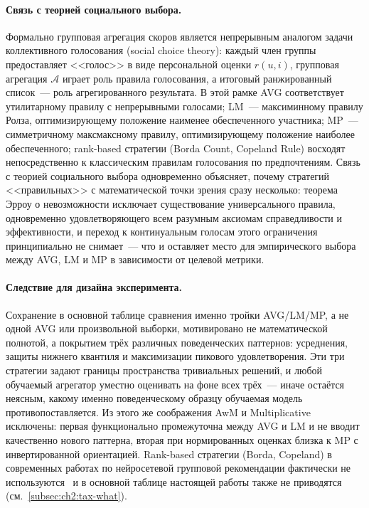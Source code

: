 \paragraph{Связь с теорией социального выбора.} Формально групповая агрегация скоров является непрерывным аналогом задачи коллективного голосования (social choice theory): каждый член группы предоставляет <<голос>> в виде персональной оценки $r(u, i)$, групповая агрегация $\mathcal{A}$ играет роль правила голосования, а итоговый ранжированный список~--- роль агрегированного результата. В этой рамке AVG соответствует утилитарному правилу с непрерывными голосами; LM~--- максиминному правилу Ролза, оптимизирующему положение наименее обеспеченного участника; MP~--- симметричному максмаксному правилу, оптимизирующему положение наиболее обеспеченного; rank-based стратегии (Borda Count, Copeland Rule) восходят непосредственно к классическим правилам голосования по предпочтениям. Связь с теорией социального выбора одновременно объясняет, почему стратегий <<правильных>> с математической точки зрения сразу несколько: теорема Эрроу о невозможности исключает существование универсального правила, одновременно удовлетворяющего всем разумным аксиомам справедливости и эффективности, и переход к континуальным голосам этого ограничения принципиально не снимает~--- что и оставляет место для эмпирического выбора между AVG, LM и MP в зависимости от целевой метрики.

\paragraph{Следствие для дизайна эксперимента.} Сохранение в основной таблице сравнения именно тройки AVG/LM/MP, а не одной AVG или произвольной выборки, мотивировано не математической полнотой, а покрытием трёх различных поведенческих паттернов: усреднения, защиты нижнего квантиля и максимизации пикового удовлетворения. Эти три стратегии задают границы пространства тривиальных решений, и любой обучаемый агрегатор уместно оценивать на фоне всех трёх~--- иначе остаётся неясным, какому именно поведенческому образцу обучаемая модель противопоставляется. Из этого же соображения AwM и Multiplicative исключены: первая функционально промежуточна между AVG и LM и не вводит качественно нового паттерна, вторая при нормированных оценках близка к MP с инвертированной ориентацией. Rank-based стратегии (Borda, Copeland) в современных работах по нейросетевой групповой рекомендации фактически не используются~\cite{cao2018agree, sankar2020groupim, xu2024aligngroup} и в основной таблице настоящей работы также не приводятся (см.~\ref{subsec:ch2:tax-what}).

